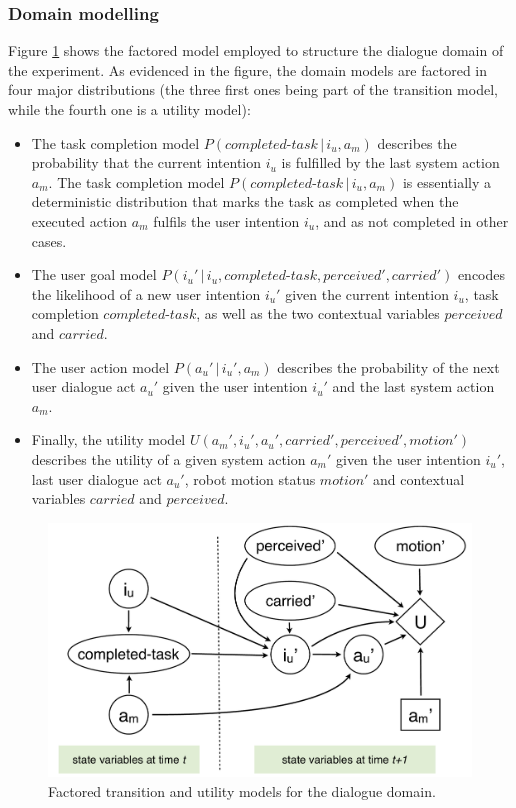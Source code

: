\subsubsection*{Domain modelling}

Figure \ref{fig:unstructuredmodel-exp3} shows the factored model employed to structure the dialogue domain of the experiment.  As evidenced in the figure, the domain models are factored in four major distributions (the three first ones being part of the transition model, while the fourth one is a utility model): 
\begin{itemize}
\item The task completion model $P(\mathit{completed\mbox{-}task}\, | \, i_u, a_m)$ describes the probability that the current intention $i_u$ is fulfilled by the last system action $a_m$.  The task completion model $P(\mathit{completed\mbox{-}task}\, | \, i_u, a_m)$ is essentially a deterministic distribution that marks the task as completed when the executed action $a_m$ fulfils the user intention $i_u$,  and as not completed in other cases. %
\item The user goal model $P(i_u' \, | \, i_u, \mathit{completed\mbox{-}task}, \mathit{perceived'}, \mathit{carried'})$ encodes the likelihood of a new user intention $i_u'$ given the current intention $i_u$, task completion $\mathit{completed\mbox{-}task}$, as well as the two contextual variables $\mathit{perceived}$ and $\mathit{carried}$. 
\item The user action model $P(a_u'\, | \, i_u', a_m)$ describes the probability of the next user dialogue act $a_u'$ given the user intention $i_u'$ and the last system action $a_m$.
\item Finally, the utility model $U(a_m', i_u', a_u', \mathit{carried'}, \mathit{perceived'}, \mathit{motion'})$ describes the utility of a given system action $a_m'$ given the user intention $i_u'$, last user dialogue act $a_u'$, robot motion status $\mathit{motion'}$ and contextual variables $\mathit{carried}$ and $\mathit{perceived}$. 
\end{itemize}

\begin{figure}[h]
\centering
\includegraphics[scale=0.4]{imgs/unstructuredmodel.pdf} 
\caption{Factored transition and utility models for the dialogue domain.}
\label{fig:unstructuredmodel-exp3}
\end{figure}

